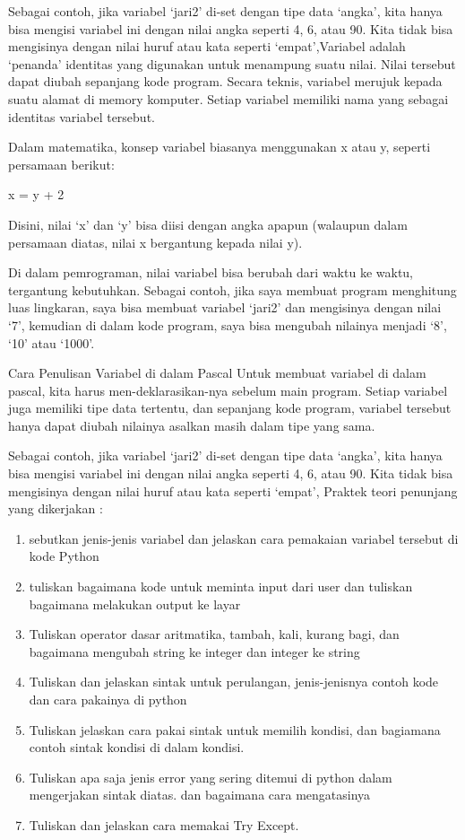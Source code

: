 Sebagai contoh, jika variabel ‘jari2’ di-set dengan tipe data ‘angka’, kita hanya bisa mengisi variabel ini dengan nilai angka seperti 4, 6, atau 90. Kita tidak bisa mengisinya dengan nilai huruf atau kata seperti ‘empat’,Variabel adalah ‘penanda’ identitas yang digunakan untuk menampung suatu nilai. Nilai tersebut dapat diubah sepanjang kode program. Secara teknis, variabel merujuk kepada suatu alamat di memory komputer. Setiap variabel memiliki nama yang sebagai identitas variabel tersebut.

Dalam matematika, konsep variabel biasanya menggunakan x atau y, seperti persamaan berikut:

x = y + 2

Disini, nilai ‘x’ dan ‘y’ bisa diisi dengan angka apapun (walaupun dalam persamaan diatas, nilai x bergantung kepada nilai y).

Di dalam pemrograman, nilai variabel bisa berubah dari waktu ke waktu, tergantung kebutuhkan. Sebagai contoh, jika saya membuat program menghitung luas lingkaran, saya bisa membuat variabel ‘jari2’ dan mengisinya dengan nilai ‘7’, kemudian di dalam kode program, saya bisa mengubah nilainya menjadi ‘8’, ‘10’ atau ‘1000’.

Cara Penulisan Variabel di dalam Pascal
Untuk membuat variabel di dalam pascal, kita harus men-deklarasikan-nya sebelum main program. Setiap variabel juga memiliki tipe data tertentu, dan sepanjang kode program, variabel tersebut hanya dapat diubah nilainya asalkan masih dalam tipe yang sama.

Sebagai contoh, jika variabel ‘jari2’ di-set dengan tipe data ‘angka’, kita hanya bisa mengisi variabel ini dengan nilai angka seperti 4, 6, atau 90. Kita tidak bisa mengisinya dengan nilai huruf atau kata seperti ‘empat’,
Praktek teori penunjang yang dikerjakan :
\begin{enumerate}
\item
sebutkan jenis-jenis variabel dan jelaskan cara pemakaian variabel tersebut di kode Python
\item
tuliskan bagaimana kode untuk meminta input dari user dan tuliskan bagaimana melakukan output ke layar
\item
Tuliskan operator dasar aritmatika, tambah, kali, kurang bagi, dan 
bagaimana mengubah string ke integer dan integer ke string
\item
Tuliskan dan jelaskan sintak untuk perulangan, jenis-jenisnya contoh kode dan cara pakainya di python
\item
Tuliskan jelaskan cara pakai sintak untuk memilih kondisi, dan bagiamana contoh sintak kondisi di dalam kondisi.
\item
Tuliskan apa saja jenis error yang sering ditemui di python dalam mengerjakan sintak diatas. 
dan bagaimana cara mengatasinya
\item
Tuliskan dan jelaskan cara memakai Try Except.
\end{enumerate}

